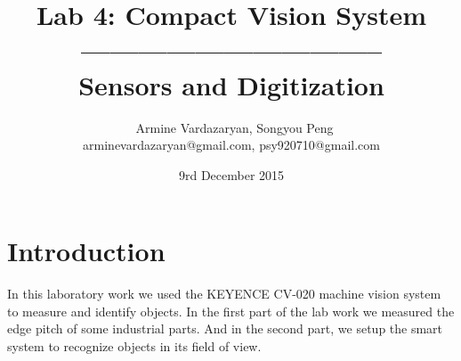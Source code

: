 \documentclass[english]{article}
\begin{document}
\title{Lab 4: Compact Vision System\\ -------------------------------- \\ \Large Sensors and Digitization}
\author{ \ Armine Vardazaryan, Songyou Peng \\ arminevardazaryan@gmail.com, psy920710@gmail.com}
\date{9rd December 2015}

\maketitle

\section{Introduction}
In this laboratory work we used the KEYENCE CV-020
machine vision system to measure and identify objects. In the first part of the lab work we measured the edge pitch of some industrial parts. 
And in the second part, we setup the smart system to recognize objects in its field of view.
\end{document}
